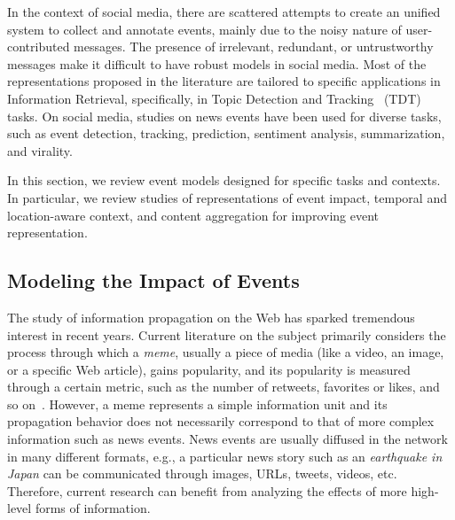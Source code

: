 In the context of social media, there are scattered attempts to create an
unified system to collect and annotate events, mainly due to the noisy nature of
user-contributed messages.
%
The presence of irrelevant, redundant, or untrustworthy messages make it
difficult to have robust models in social media.
%
Most of the representations proposed in the literature are tailored to specific
applications in Information Retrieval, specifically, in Topic Detection and
Tracking~\cite{allan2012topic} (TDT) tasks.
%
On social media, studies on news events have been used for diverse tasks,
such as event detection, tracking, prediction, sentiment analysis,
summarization, and virality. 
%

In this section, we review event models designed for specific tasks and
contexts. 
%
In particular, we review studies of representations of event impact, temporal
and location-aware context, and content aggregation for improving event
representation.


\subsection{Modeling the Impact of Events}

The study of information propagation on the Web has sparked tremendous interest
in recent years. 
%
Current literature on the subject primarily considers the process through which
a {\em meme}, usually a piece of media (like a video, an image, or a specific
Web article), gains popularity, and its popularity is measured through a certain
metric, such as the number of retweets, favorites or likes, and so
on~\cite{Castillo:2014,Szabo:2010,Lerman:2010,Tatar2014,Pinto:2013,Ahmed:2013,Li:2016:concept:drift,
Liu:2015:UN,10.1145/1963192.1963222,ICWSM112754}. 
%
However, a meme represents a simple information unit and its propagation
behavior does not necessarily correspond to that of more complex information
such as news events. 
%
News events are usually diffused in the network in many different formats, e.g.,
a particular news story such as an {\em earthquake in Japan} can be communicated
through images, URLs, tweets, videos, etc. 
%
Therefore, current research can benefit from analyzing the effects of more
high-level forms of information. 

